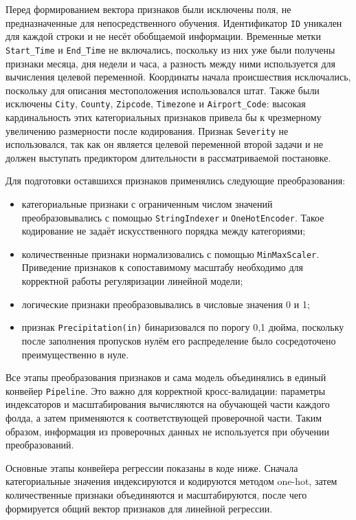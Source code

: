 Перед формированием вектора признаков были исключены поля, не предназначенные для непосредственного обучения. Идентификатор \texttt{ID} уникален для каждой строки и не несёт обобщаемой информации. Временные метки \texttt{Start\_Time} и \texttt{End\_Time} не включались, поскольку из них уже были получены признаки месяца, дня недели и часа, а разность между ними используется для вычисления целевой переменной. Координаты начала происшествия исключались, поскольку для описания местоположения использовался штат. Также были исключены \texttt{City}, \texttt{County}, \texttt{Zipcode}, \texttt{Timezone} и \texttt{Airport\_Code}: высокая кардинальность этих категориальных признаков привела бы к чрезмерному увеличению размерности после кодирования. Признак \texttt{Severity} не использовался, так как он является целевой переменной второй задачи и не должен выступать предиктором длительности в рассматриваемой постановке.

Для подготовки оставшихся признаков применялись следующие преобразования:
\begin{itemize}
    \item категориальные признаки с ограниченным числом значений преобразовывались с помощью \texttt{StringIndexer} и \texttt{OneHotEncoder}. Такое кодирование не задаёт искусственного порядка между категориями;
    \item количественные признаки нормализовались с помощью \texttt{MinMaxScaler}. Приведение признаков к сопоставимому масштабу необходимо для корректной работы регуляризации линейной модели;
    \item логические признаки преобразовывались в числовые значения 0 и 1;
    \item признак \texttt{Precipitation(in)} бинаризовался по порогу 0,1 дюйма, поскольку после заполнения пропусков нулём его распределение было сосредоточено преимущественно в нуле.
\end{itemize}

Все этапы преобразования признаков и сама модель объединялись в единый конвейер \texttt{Pipeline}. Это важно для корректной кросс-валидации: параметры индексаторов и масштабирования вычисляются на обучающей части каждого фолда, а затем применяются к соответствующей проверочной части. Таким образом, информация из проверочных данных не используется при обучении преобразований.

Основные этапы конвейера регрессии показаны в коде ниже. Сначала категориальные значения индексируются и кодируются методом one-hot, затем количественные признаки объединяются и масштабируются, после чего формируется общий вектор признаков для линейной регрессии.

